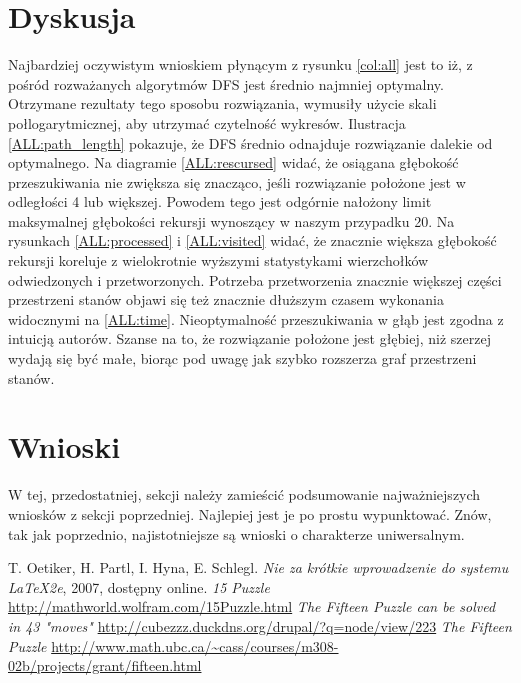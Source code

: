 \documentclass{classrep}
\begin{document}
\section{Dyskusja}
Najbardziej oczywistym wnioskiem płynącym z rysunku \ref{col:all} jest to iż, z pośród rozważanych algorytmów DFS jest średnio najmniej optymalny.
Otrzymane rezultaty tego sposobu rozwiązania, wymusiły użycie skali połlogarytmicznej, aby utrzymać czytelność wykresów.
Ilustracja \ref{ALL:path_length} pokazuje, że DFS średnio odnajduje rozwiązanie dalekie od optymalnego.
Na diagramie \ref{ALL:rescursed} widać, że osiągana głębokość przeszukiwania nie zwiększa się znacząco, jeśli rozwiązanie położone jest w odległości 4 lub większej.
Powodem tego jest odgórnie nałożony limit maksymalnej głębokości rekursji wynoszący w naszym przypadku 20.
Na rysunkach \ref{ALL:processed} i \ref{ALL:visited} widać, że znacznie większa głębokość rekursji koreluje z wielokrotnie wyższymi statystykami wierzchołków odwiedzonych i przetworzonych.
Potrzeba przetworzenia znacznie większej części przestrzeni stanów objawi się też znacznie dłuższym czasem wykonania widocznymi na \ref{ALL:time}.
Nieoptymalność przeszukiwania w głąb jest zgodna z intuicją autorów.
Szanse na to, że rozwiązanie położone jest głębiej, niż szerzej wydają się być małe, biorąc pod uwagę jak szybko rozszerza graf przestrzeni stanów.











\section{Wnioski}
{\color{blue}
W tej, przedostatniej, sekcji należy zamieścić podsumowanie najważniejszych
wniosków z sekcji poprzedniej. Najlepiej jest je po prostu wypunktować. Znów,
tak jak poprzednio, najistotniejsze są wnioski o charakterze uniwersalnym.}

\begin{thebibliography}{0}
   T. Oetiker, H. Partl, I. Hyna, E. Schlegl.
    \textsl{Nie za krótkie wprowadzenie do systemu \LaTeX2e}, 2007, dostępny
    online.
   \textsl{15 Puzzle} \url{http://mathworld.wolfram.com/15Puzzle.html}
   \textsl{The Fifteen Puzzle can be solved in 43 "moves"} \url{http://cubezzz.duckdns.org/drupal/?q=node/view/223}
   \textsl{The Fifteen Puzzle} \url{http://www.math.ubc.ca/~cass/courses/m308-02b/projects/grant/fifteen.html}
\end{thebibliography}
\end{document}
